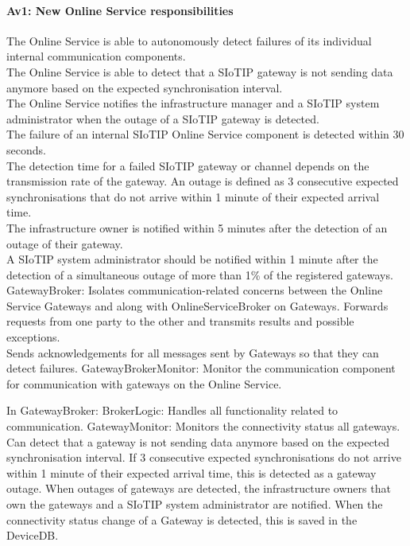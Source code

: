         \paragraph{Av1: New Online Service responsibilities}
            The Online Service is able to autonomously detect failures of its individual internal communication components.\\
            The Online Service is able to detect that a SIoTIP gateway is not sending data anymore based on the expected synchronisation interval.\\
            The Online Service notifies the infrastructure manager and a SIoTIP system administrator when the outage of a SIoTIP gateway is detected.\\
            The failure of an internal SIoTIP Online Service component is detected within 30 seconds.\\
            The detection time for a failed SIoTIP gateway or channel depends on the transmission rate
            of the gateway. An outage is defined as 3 consecutive expected synchronisations that do not
            arrive within 1 minute of their expected arrival time.\\
            The infrastructure owner is notified within 5 minutes after the detection of an outage of their gateway.\\
            A SIoTIP system administrator should be notified within 1 minute after the detection
            of a simultaneous outage of more than 1\% of the registered gateways.\\

            GatewayBroker: Isolates communication-related concerns between the Online Service Gateways and along with OnlineServiceBroker on Gateways.
                       Forwards requests from one party to the other and transmits results and possible exceptions. \\
                       Sends acknowledgements for all messages sent by Gateways so that they can detect failures.
            GatewayBrokerMonitor: Monitor the communication component for communication with gateways on the Online Service.

            In GatewayBroker:
                BrokerLogic: Handles all functionality related to communication.
                GatewayMonitor: Monitors the connectivity status all gateways. Can detect that a gateway is not sending data anymore based on the expected synchronisation interval. If 3 consecutive expected synchronisations do not arrive within 1 minute of their expected arrival time,
                            this is detected as a gateway outage. When outages of gateways are detected, the infrastructure owners that own the gateways and a SIoTIP system administrator are notified.
                            When the connectivity status change of a Gateway is detected, this is saved in the DeviceDB.



